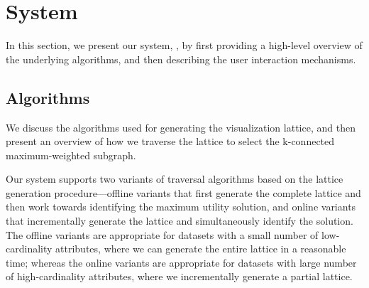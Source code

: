 
\section{\system System\label{sec:system}}
In this section, we present our system, \system, by first providing a high-level overview of the underlying algorithms, and then describing the user interaction mechanisms.

\subsection{Algorithms\label{sec:algorithms}}
We discuss the algorithms used for generating the visualization lattice, and then present an overview of how we traverse the lattice to select the k-connected maximum-weighted subgraph.

 Our system supports two variants of traversal algorithms based on the lattice generation procedure---offline variants that first generate the complete lattice and then work towards identifying the maximum utility solution, and online variants that incrementally generate the lattice and simultaneously identify the solution. The offline variants are appropriate for datasets with a small number of low-cardinality attributes, where we can generate the entire lattice in a reasonable time; whereas the online variants are appropriate for datasets with large number of high-cardinality attributes, where we incrementally generate a partial lattice.

